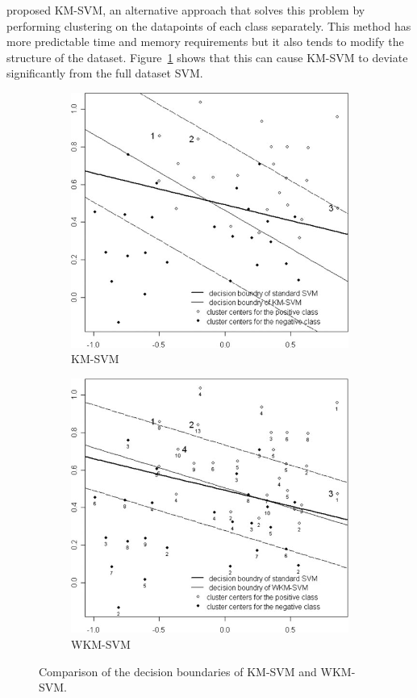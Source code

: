 \citet{Lee2007} proposed KM-SVM, an alternative approach that solves this problem by performing clustering on the datapoints of each class separately.
This method has more predictable time and memory requirements but it also tends to modify the structure of the dataset.
Figure~\ref{fig:wkmsvm:compare:km} shows that this can cause KM-SVM to deviate significantly from the full dataset SVM.\
\begin{figure}
	\begin{subfigure}{0.5\textwidth}
		\centering
		\includegraphics[width=0.85\linewidth]{gfx/wkmsvm/km.png}
		\caption{KM-SVM}\label{fig:wkmsvm:compare:km}
	\end{subfigure}
	\begin{subfigure}{0.5\textwidth}
		\centering
		\includegraphics[width=0.85\linewidth]{gfx/wkmsvm/wkm.png}
		\caption{WKM-SVM}\label{fig:wkmsvm:compare:wkm}
	\end{subfigure}
	\caption{Comparison of the decision boundaries of KM-SVM and WKM-SVM.}\label{fig:wkmsvm:compare}
\end{figure}

